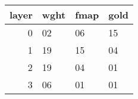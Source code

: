 \begin{tabular}{rlll}
\toprule
 layer & wght & fmap & gold \\
\midrule
     0 &   02 &   06 &   15 \\
     1 &   19 &   15 &   04 \\
     2 &   19 &   04 &   01 \\
     3 &   06 &   01 &   01 \\
\bottomrule
\end{tabular}
